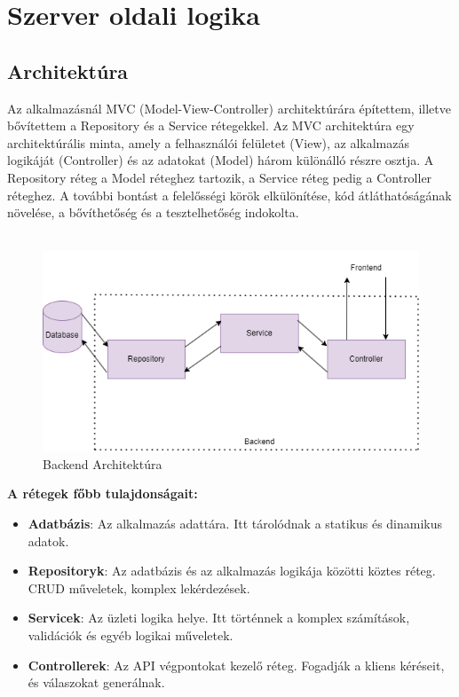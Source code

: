 \section*{Szerver oldali logika}
\subsection*{Architektúra}
Az alkalmazásnál MVC (Model-View-Controller) architektúrára építettem, illetve
bővítettem a Repository és a Service rétegekkel. Az MVC architektúra egy
architektúrális minta, amely a felhasználói felületet (View), az alkalmazás
logikáját (Controller) és az adatokat (Model) három különálló részre osztja.
A Repository réteg a Model réteghez tartozik, a Service réteg pedig a Controller réteghez.
A további bontást a felelősségi körök elkülönítése, kód átláthatóságának növelése, a bővíthetőség és a tesztelhetőség indokolta.
\\
\\
\begin{figure}[H]
    \centering
    \includegraphics[width=14.0truecm]{images/Backend_architecture.png}
    \caption{Backend Architektúra}
    \label{fig:backend_architecture}
\end{figure}
\textbf{A rétegek főbb tulajdonságait:}
\begin{itemize}
    \item \textbf{Adatbázis}: Az alkalmazás adattára. Itt tárolódnak a statikus és dinamikus adatok.
    \item \textbf{Repositoryk}: Az adatbázis és az alkalmazás logikája közötti köztes réteg. CRUD műveletek, komplex lekérdezések.
    \item \textbf{Servicek}: Az üzleti logika helye. Itt történnek a komplex számítások, validációk és egyéb logikai műveletek.
    \item \textbf{Controllerek}: Az API végpontokat kezelő réteg. Fogadják a kliens kéréseit, és válaszokat generálnak.
\end{itemize}

